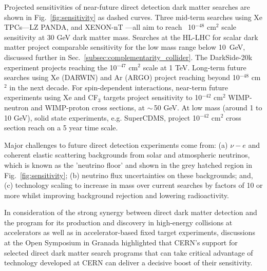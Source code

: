 \documentclass[../report.tex]{subfiles}
\begin{document}
Projected sensitivities of near-future direct detection dark matter searches are shown in Fig.~\ref{fig:sensitivity} as dashed curves.  Three mid-term searches using Xe TPCs---LZ %
PANDA, and XENON-nT 
---all aim to reach ~10$^{-48}$ cm$^2$ scale sensitivity at 30 GeV dark matter mass.  Searches at the HL-LHC for scalar dark matter project comparable sensitivity for the low mass range below 10~GeV,
discussed further in Sec.~\ref{subsec:complementarity_collider}. The DarkSide-20k experiment projects reaching the 10$^{-47}$ cm$^2$ scale at 1 TeV.  Long-term future searches using Xe (DARWIN) and Ar (ARGO) project reaching beyond 10$^{-48}$ cm$^2$ in the next decade. For spin-dependent interactions, near-term future experiments using Xe and CF$_3$ targets project sensitivity to 10$^{-42}$ cm$^2$ WIMP-neutron
and WIMP-proton cross sections, at $\sim$\,50 GeV.
%
At low mass (around 1 to 10 GeV), solid state experiments, e.g. SuperCDMS, project 10$^{-42}$ cm$^2$ cross section reach on a 5 year time scale.

Major challenges to future direct detection experiments come from: (a)  $\nu-e$ and coherent elastic scattering backgrounds from solar and atmospheric neutrinos, which is known as the 'neutrino floor' and shown in the grey hatched region in Fig.~\ref{fig:sensitivity}; (b) neutrino flux uncertainties on these backgrounds; and, (c) technology scaling to increase in mass over current searches by factors of 10 or more whilst improving background rejection and lowering radioactivity.

In consideration of the strong synergy between direct dark matter detection and the program for its production and discovery in high-energy collisions at accelerators as well as in accelerator-based fixed target experiments, discussions at the Open Symposium in Granada highlighted that CERN's support for selected direct dark matter search programs that can take critical advantage of technology developed at CERN can deliver a decisive boost of their sensitivity.
\end{document}
